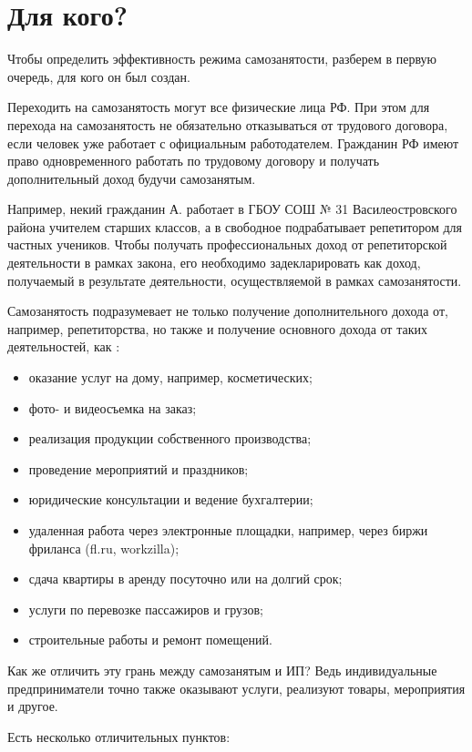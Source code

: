 \section{Для кого?}

Чтобы определить эффективность режима самозанятости, разберем в первую очередь, для кого он был создан.

Переходить на самозанятость могут все физические лица РФ. 
При этом для перехода на самозанятость не обязательно 
отказываться от трудового договора,
если человек уже работает с официальным работодателем.
Гражданин РФ имеют право одновременного работать по трудовому договору 
и получать дополнительный доход будучи самозанятым. 

Например, некий гражданин А. работает в
ГБОУ СОШ № 31 Василеостровского района
учителем старших классов, а в свободное
подрабатывает репетитором для частных учеников. 
Чтобы получать профессиональных доход от репетиторской деятельности
в рамках закона, его необходимо задекларировать как доход,
получаемый в результате деятельности,
осуществляемой в рамках самозанятости.

Самозанятость подразумевает не только получение дополнительного дохода от, 
например, репетиторства, 
но также и получение основного дохода от таких деятельностей, как \cite{kontur}:

\begin{itemize}
	\item оказание услуг на дому, например, косметических;
	\item фото- и видеосъемка на заказ;
	\item реализация продукции собственного производства;
	\item проведение мероприятий и праздников;
	\item юридические консультации и ведение бухгалтерии;
	\item удаленная работа через электронные площадки, например, через биржи фриланса (fl.ru, workzilla);
	\item сдача квартиры в аренду посуточно или на долгий срок;
	\item услуги по перевозке пассажиров и грузов;
	\item строительные работы и ремонт помещений.
\end{itemize}

Как же отличить эту грань между самозанятым и ИП? 
Ведь индивидуальные предприниматели точно также оказывают услуги, 
реализуют товары, мероприятия и другое.

Есть несколько отличительных пунктов: 

